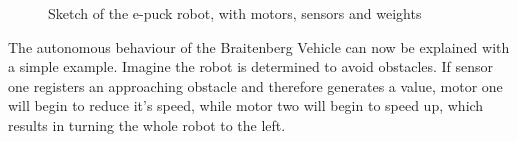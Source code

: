 \documentclass[a4paper]{jacow}
\begin{document}
\begin{figure}[hbt]
	\centering
	\caption{Sketch of the e-puck robot, with motors, sensors and weights}
	\label{fig:epuck}
\end{figure}

The autonomous behaviour of the Braitenberg Vehicle can now be explained with a simple example. Imagine the robot is determined to avoid obstacles. If sensor one registers an approaching obstacle and therefore generates a value, motor one will begin to reduce it's speed, while motor two will begin to speed up, which results in turning the whole robot to the left.
\end{document}
